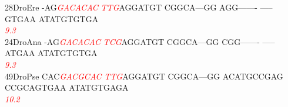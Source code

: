 \documentclass[11pt,twoside,reqno,a4paper]{article}
\begin{document}
{28\hspace*{2\charwidth}DroEre	-AG\textit{\textcolor{Red}{G}}\textit{\textcolor{Red}{A}}\textit{\textcolor{Red}{C}}\textit{\textcolor{Red}{A}}\textit{\textcolor{Red}{C}}\textit{\textcolor{Red}{A}}\textit{\textcolor{Red}{C}}	\textit{\textcolor{Red}{T}}\textit{\textcolor{Red}{T}}\textit{\textcolor{Red}{G}}AGGATGT	CGGCA---GG	AGG-------	-----GTGAA	ATATGTGTGA	\\
\hspace*{4\charwidth}\hspace*{7\charwidth}\hspace*{3\charwidth}\textit{\textcolor{Red}{9.3}}\hspace*{1\charwidth}\hspace*{1\charwidth}\hspace*{1\charwidth}\hspace*{1\charwidth}\hspace*{1\charwidth}\hspace*{1\charwidth}\\
24\hspace*{2\charwidth}DroAna	-AG\textit{\textcolor{Red}{G}}\textit{\textcolor{Red}{A}}\textit{\textcolor{Red}{C}}\textit{\textcolor{Red}{A}}\textit{\textcolor{Red}{C}}\textit{\textcolor{Red}{A}}\textit{\textcolor{Red}{C}}	\textit{\textcolor{Red}{T}}\textit{\textcolor{Red}{C}}\textit{\textcolor{Red}{G}}AGGATGT	CGGCA---GG	CGG-------	-----ATGAA	ATATGTGTGA	\\
\hspace*{4\charwidth}\hspace*{7\charwidth}\hspace*{3\charwidth}\textit{\textcolor{Red}{9.3}}\hspace*{1\charwidth}\hspace*{1\charwidth}\hspace*{1\charwidth}\hspace*{1\charwidth}\hspace*{1\charwidth}\hspace*{1\charwidth}\\
49\hspace*{2\charwidth}DroPse	CAC\textit{\textcolor{Red}{G}}\textit{\textcolor{Red}{A}}\textit{\textcolor{Red}{C}}\textit{\textcolor{Red}{G}}\textit{\textcolor{Red}{C}}\textit{\textcolor{Red}{A}}\textit{\textcolor{Red}{C}}	\textit{\textcolor{Red}{T}}\textit{\textcolor{Red}{T}}\textit{\textcolor{Red}{G}}AGGATGT	CGGCA---GG	ACATGCCGAG	CCGCAGTGAA	ATATGTGAGA	\\
\hspace*{4\charwidth}\hspace*{7\charwidth}\hspace*{3\charwidth}\textit{\textcolor{Red}{10.2}}\hspace*{1\charwidth}\hspace*{1\charwidth}\hspace*{1\charwidth}\hspace*{1\charwidth}\hspace*{1\charwidth}\hspace*{1\charwidth}\\
}
\end{document}
